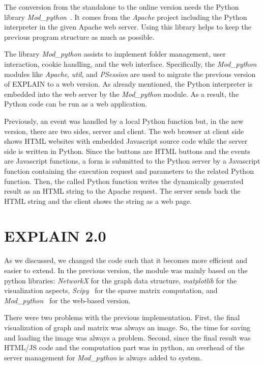 \documentclass[12pt, oneside]{book}
\begin{document}
The conversion from the standalone to the online version needs the Python library \textit{Mod\_python}~\cite{modpython2013}. It comes from the \textit{Apache} project including the Python interpreter in the given Apache web server. Using this library helps to keep the previous program structure as much as possible.

The library \textit{Mod\_python} assists to implement folder management, user interaction, cookie handling, and the web interface. Specifically, the \textit{Mod\_python} modules like \textit{Apache}, \textit{util}, and \textit{PSession} are used to migrate the previous version of \mbox{EXPLAIN} to a web version. As already mentioned, the Python interpreter is embedded into the web server by the \textit{Mod\_python} module. As a result, the Python code can be run as a web application.

Previously, an event was handled by a local Python function but, in the new version, there are two sides, server and client. The web browser at client side shows HTML websites with embedded  Javascript source code while the server side is written in Python. Since the buttons are HTML buttons and the events are Javascript functions, a form is submitted to the Python server by a Javascript function containing the execution request and parameters to the related Python function. Then, the called Python function writes the dynamically generated result as an HTML string to the Apache request. The server sends back the HTML string and the client shows the string as a web page.

\section{EXPLAIN 2.0}
As we discussed, we changed the code such that it becomes more efficient and easier to extend. 
In the previous version, the module was mainly based on the python libraries:
\textit{NetworkX} \cite{networkx2008} for the graph data structure,
\textit{matplotlib} \cite{matplotlib2007} for the visualization aspects,
\textit{Scipy}~\cite{scipy2001} for the sparse matrix computation, and
\textit{Mod\_python}~\cite{modpython2013} for the web-based version. 

There were two problems with the previous implementation. First, the final visualization
of graph and matrix was always an image. 
So, the time for saving and loading the image was always a problem.
Second, since the final result was HTML/JS code and the computation part was in python,
an overhead of the server management for \textit{Mod\_python} is always added to system.
\end{document}
